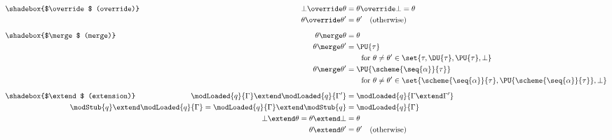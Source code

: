 \begin{figure}
\begin{DeletedBlock}
\small
\setlength{\jot}{1pt}
\newcommand*{\opname}[1]{\makebox[0.22\textwidth][l]{\shadebox{#1}}}
\newcommand*{\opblank}{\makebox[0.22\textwidth]{}}
\begin{alignat*}{2}
\opname{$\override$ (override)} && \bot \override \theta &= \theta \override \bot = \theta \\
\opblank && \theta \override \theta' &= \theta' \quad \text{(otherwise)} \\[2mm]
\opname{$\merge$ (merge)} && \theta \merge \theta &= \theta \\
\opblank && \theta \merge \theta' &= \PU{\tau} \\
\opblank && &\qquad \text{for } \theta \neq \theta' \in \set{\tau, \DU{\tau}, \PU{\tau}, \bot} \\
\opblank && \theta \merge \theta' &{}= \PU{\scheme{\seq{\alpha}}{\tau}} \\
\opblank && &\qquad \text{for } \theta \neq \theta' \in \set{\scheme{\seq{\alpha}}{\tau}, \PU{\scheme{\seq{\alpha}}{\tau}}, \bot} \\[2mm]
\opname{$\extend$ (extension)} && \modLoaded{q}{\Gamma} \extend \modLoaded{q}{\Gamma'} &= \modLoaded{q}{\Gamma \extend \Gamma'} \\
\opblank && \modStub{q} \extend \modLoaded{q}{\Gamma} = \modLoaded{q}{\Gamma} \extend \modStub{q} &= \modLoaded{q}{\Gamma} \\
\opblank && \bot \extend \theta = \theta \extend \bot &= \theta \\
\opblank && \theta \extend \theta' &= \theta' \quad \text{(otherwise)}
\end{alignat*}
\caption{}
\label{fig:context-ops}
\end{DeletedBlock}
\end{figure}
